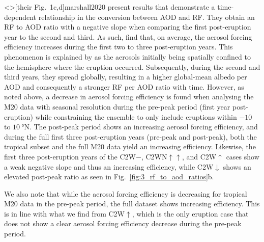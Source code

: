 \documentclass[draft]{agujournal2019}
\newcommand{\cwm}{C2W\(\downarrow\)}
\newcommand{\cwmp}{C2W\(-\)}
\newcommand{\cwss}{C2WN\(\uparrow\uparrow\)}
\newcommand{\cwsn}{C2W\(\uparrow\)}
\begin{document}
\citeA<>[their Fig.\ 1c,d]{marshall2020} present results that demonstrate a
time-dependent relationship in the conversion between AOD and RF. They obtain an RF to
AOD ratio with a negative slope when comparing the first post-eruption year to the
second and third. As such,  find that, on average, the aerosol
forcing efficiency increases during the first two to three post-eruption years. This
phenomenon is explained by  as the aerosols initially being
spatially confined to the hemisphere where the eruption occurred. Subsequently, during
the second and third years, they spread globally, resulting in a higher global-mean
albedo per AOD and consequently a stronger RF per AOD ratio with time. However, as noted
above, a decrease in aerosol forcing efficiency is found when analysing the M20 data
with seasonal resolution during the pre-peak period (first year post-eruption) while
constraining the ensemble to only include eruptions within \(-10\) to
\(\SI{10}{\degree\mathrm{N}}\). The post-peak period shows an increasing aerosol forcing
efficiency, and during the full first three post-eruption years (pre-peak and
post-peak), both the tropical subset and the full M20 data yield an increasing
efficiency. Likewise, the first three post-eruption years of the \cwmp{}, \cwss{}, and
\cwsn{} cases show a weak negative slope and thus an increasing efficiency, while \cwm{}
shows an elevated post-peak ratio as seen in Fig.~\ref{fig:3_rf_to_aod_ratios}b.

We also note that while the aerosol forcing efficiency is decreasing for tropical M20
data in the pre-peak period, the full dataset shows increasing efficiency. This is in
line with what we find from \cwsn{}, which is the only eruption case that does not show
a clear aerosol forcing efficiency decrease during the pre-peak period.
\end{document}
